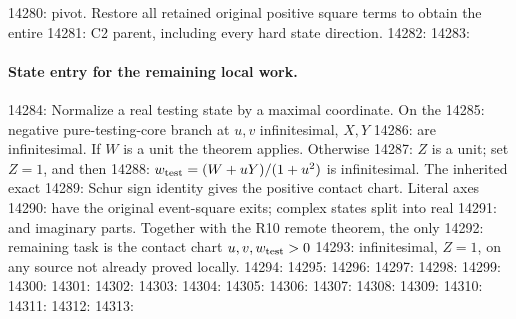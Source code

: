 14280: pivot. Restore all retained original positive square terms to obtain the entire
14281: C2 parent, including every hard state direction.
14282: 
14283: \paragraph{State entry for the remaining local work.}
14284: Normalize a real testing state by a maximal coordinate. On the
14285: negative pure-testing-core branch at $u,v$ infinitesimal, $X,Y$
14286: are infinitesimal. If $W$ is a unit the theorem applies. Otherwise
14287: $Z$ is a unit; set $Z=1$, and then
14288: $w_{\rm test}=(W+uY)/(1+u^2)$ is infinitesimal. The inherited exact
14289: Schur sign identity gives the positive contact chart. Literal axes
14290: have the original event-square exits; complex states split into real
14291: and imaginary parts. Together with the R10 remote theorem, the only
14292: remaining task is the contact chart $u,v,w_{\rm test}>0$
14293: infinitesimal, $Z=1$, on any source not already proved locally.
14294: 
14295: \label{component:p78dfeedee062}
14296: \label{p78dfeedee062:sec:r17-r4-eunit}
14297: \label{component:p1c9902e9a6f2}
14298: \label{p1c9902e9a6f2:sec:r18-r3-eunit}
14299: \label{component:p8da9ea6ed9e5}
14300: \label{p8da9ea6ed9e5:sec:r17-r5}
14301: \label{component:pd5fa361b4623}
14302: \label{pd5fa361b4623:sec:r17-r6-bounded-a}
14303: \label{component:p9a223c96c696}
14304: \label{p9a223c96c696:sec:r17-r7-bounded-a}
14305: \label{component:p482fcad1a2e2}
14306: \label{p482fcad1a2e2:sec:r17-r8-small-r}
14307: \label{component:p0d4eedd6c7a4}
14308: \label{p0d4eedd6c7a4:sec:r9-weak-A-remote}
14309: \label{component:p99372d145f17}
14310: \label{p99372d145f17:sec:r11-small-r-local}
14311: \label{component:p34609a6519a6}
14312: \label{p34609a6519a6:sec:r11-small-r-remote}
14313:
